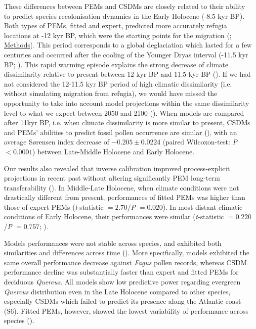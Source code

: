 These differences between PEMs and CSDMs are closely related to their ability to predict species recolonisation dynamics in the Early Holocene (-8.5 kyr BP). Both types of PEMs, fitted and expert, predicted more accurately refugia locations at -12 kyr BP, which were the starting points for the migration (; \hyperref[methods2]{Methods}). This period corresponds to a global deglaciation which lasted for a few centuries and occurred after the cooling of the Younger Dryas interval  (-11.5 kyr BP; ). This rapid warming episode explains the strong decrease of climate dissimilarity relative to present between 12 kyr BP and 11.5 kyr BP (). If we had not considered the 12-11.5 kyr BP period of high climatic dissimilarity (i.e. without simulating migration from refugia), we would have missed the opportunity to take into account model projections within the same dissimilarity level to what we expect between 2050 and 2100 (). When models are compared after 11kyr BP, i.e. when climate dissimilarity is more similar to present, CSDMs and PEMs' abilities to predict fossil pollen occurrence are similar (), with an average Sørensen index decrease of $-0.205\pm0.0224$ (paired Wilcoxon-test: \emph{P} $<0.0001$) between Late-Middle Holocene and Early Holocene.

Our results also revealed that inverse calibration improved process-explicit projections in recent past without altering significantly PEM long-term transferability (). In Middle-Late Holocene, when climate conditions were not drastically different from present, performances of fitted PEMs was higher than those of expert PEMs (\emph{t}-statistic $=2.70$/\emph{P} $=0.020$). In most distant climatic conditions of Early Holocene, their performances were similar (\emph{t}-statistic $=0.220$/\emph{P} $=0.757$; ). 

Models performances were not stable across species, and exhibited both similarities and differences across time (). More specifically, models exhibited the same overall performance decrease against \emph{Fagus} pollen records, whereas CSDM performance decline was substantially faster than expert and fitted PEMs for deciduous \emph{Quercus}. All models show low predictive power regarding evergreen \emph{Quercus} distribution even in the Late Holocene compared to other species, especially CSDMs which failed to predict its presence along the Atlantic coast (S6). Fitted PEMs, however, showed the lowest variability of performance across species ().

